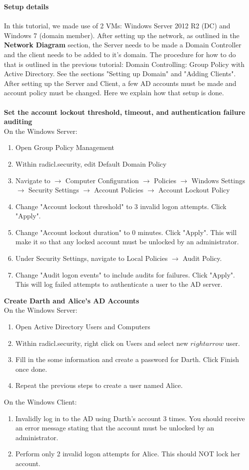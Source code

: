 \documentclass[12pt]{extarticle}
\newcommand{\ben}{\begin{enumerate}}
\newcommand{\een}{\end{enumerate}}
\begin{document}
\pagebreak
\noindent
\textbf{Setup details}\\\\
In this tutorial, we made use of 2 VMs: Windows Server 2012 R2 (DC) and Windows 7 (domain member). After setting up the network, as outlined in the \textbf{Network Diagram} section, the Server needs to be made a Domain Controller and the client needs to be added to it's domain. The procedure for how to do that is outlined in the previous tutorial: Domain Controlling: Group Policy with Active Directory. See the sections "Setting up Domain" and "Adding Clients".\\
After setting up the Server and Client, a few AD accounts must be made and account policy must be changed. Here we explain how that setup is done.\\\\
\textbf{Set the account lockout threshold, timeout, and authentication failure auditing}\\
On the Windows Server:
\ben
	\item Open Group Policy Management
	\item Within radicl.security, edit Default Domain Policy
	\item Navigate to $\rightarrow$ Computer Configuration $\rightarrow$ Policies $\rightarrow$ Windows Settings $				\rightarrow$ Security Settings $\rightarrow$ Account Policies $\rightarrow$ Account Lockout Policy
	\item Change "Account lockout threshold" to 3 invalid logon attempts. Click "Apply".
	\item Change "Account lockout duration" to 0 minutes.  Click "Apply". This will make it so that any locked account 			must be unlocked by an administrator.
	\item Under Security Settings, navigate to Local Policies $\rightarrow$ Audit Policy.
	\item Change "Audit logon events" to include audits for failures. Click "Apply". This will log failed attempts to 			authenticate a user to the AD server. 
\een
\textbf{Create Darth and Alice's AD Accounts}\\
On the Windows Server:
\ben
	\item Open Active Directory Users and Computers
	\item Within radicl.security, right click on Users and select new $rightarrow$ user.
	\item Fill in the some information and create a password for Darth. Click Finish once done.
	\item Repeat the previous steps to create a user named Alice.
\een
On the Windows Client:
\ben
	\item Invalidly log in to the AD using Darth's account 3 times. You should receive an error message stating that the 		account must be unlocked by an administrator.
	\item Perform only 2 invalid logon attempts for Alice. This should NOT lock her account.
\een
\end{document}
